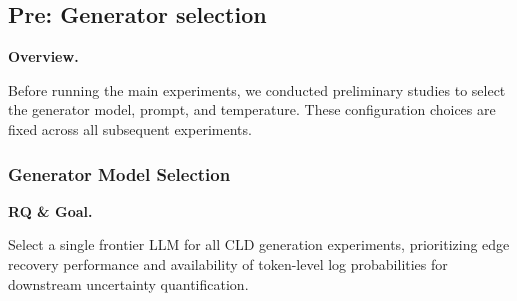 \begingroup
\setlength{\leftskip}{1.25em}
\setlength{\parindent}{0pt}
\setlength{\parskip}{2pt}
\makeatletter
\renewcommand{\paragraph}[1]{\par\noindent\textbf{#1}\par\noindent}
\renewcommand{\subparagraph}[1]{\par\noindent\textbf{#1}\par\noindent}
\makeatother

\subsection{Pre: Generator selection}
\label{sec:preliminary_studies}

\paragraph{Overview.}
Before running the main experiments, we conducted preliminary studies to select the generator model, prompt, and temperature. These configuration choices are fixed across all subsequent experiments.

\subsubsection{Generator Model Selection}

\paragraph{RQ \& Goal.}
Select a single frontier LLM for all CLD generation experiments, prioritizing edge recovery performance and availability of token-level log probabilities for downstream uncertainty quantification.

